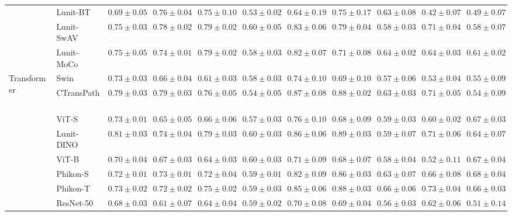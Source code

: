 \begin{tabular}{ll|cccc|c|cccc}
 & Lunit-BT~\cite{kang2023benchmarking} & $0.69 \pm 0.05$ & $0.76 \pm 0.04$ & $0.75 \pm 0.10$ & $0.53 \pm 0.02$ & $0.64 \pm 0.19$ & $0.75 \pm 0.17$ & $0.63 \pm 0.08$ & $0.42 \pm 0.07$ & $0.49 \pm 0.07$ \\
 & Lunit-SwAV~\cite{kang2023benchmarking} & $0.75 \pm 0.03$ & $\mathbf{0.78 \pm 0.02}$ & $\mathbf{0.79 \pm 0.02}$ & $0.60 \pm 0.05$ & $0.83 \pm 0.06$ & $0.79 \pm 0.04$ & $0.58 \pm 0.03$ & $0.71 \pm 0.04$ & $0.58 \pm 0.07$ \\
 & Lunit-MoCo~\cite{kang2023benchmarking} & $0.75 \pm 0.05$ & $0.74 \pm 0.01$ & $0.79 \pm 0.02$ & $0.58 \pm 0.03$ & $0.82 \pm 0.07$ & $0.71 \pm 0.08$ & $0.64 \pm 0.02$ & $0.64 \pm 0.03$ & $0.61 \pm 0.02$ \\
\cline{1-11}
\multirow[t]{12}{*}{Transformer} & Swin~\cite{liu2021swin} & $0.73 \pm 0.03$ & $0.66 \pm 0.04$ & $0.61 \pm 0.03$ & $0.58 \pm 0.03$ & $0.74 \pm 0.10$ & $0.69 \pm 0.10$ & $0.57 \pm 0.06$ & $0.53 \pm 0.04$ & $0.55 \pm 0.09$ \\
 & CTransPath~\cite{wang2022transformer} & $0.79 \pm 0.03$ & $\mathbf{0.79 \pm 0.03}$ & $0.76 \pm 0.05$ & $0.54 \pm 0.05$ & $\mathbf{0.87 \pm 0.08}$ & $0.88 \pm 0.02$ & $0.63 \pm 0.03$ & $0.71 \pm 0.05$ & $0.54 \pm 0.09$ \\
 & ViT-S~\cite{kolesnikov2021image} & $0.73 \pm 0.01$ & $0.65 \pm 0.05$ & $0.66 \pm 0.06$ & $0.57 \pm 0.03$ & $0.76 \pm 0.10$ & $0.68 \pm 0.09$ & $0.59 \pm 0.03$ & $0.60 \pm 0.02$ & $0.67 \pm 0.03$ \\
 & Lunit-DINO~\cite{kang2023benchmarking} & $\mathbf{0.81 \pm 0.03}$ & $0.74 \pm 0.04$ & $\mathbf{0.79 \pm 0.03}$ & $\mathbf{0.60 \pm 0.03}$ & $0.86 \pm 0.06$ & $\mathbf{0.89 \pm 0.03}$ & $0.59 \pm 0.07$ & $0.71 \pm 0.06$ & $0.64 \pm 0.07$ \\
 & ViT-B~\cite{kolesnikov2021image} & $0.70 \pm 0.04$ & $0.67 \pm 0.03$ & $0.64 \pm 0.03$ & $0.60 \pm 0.03$ & $0.71 \pm 0.09$ & $0.68 \pm 0.07$ & $0.58 \pm 0.04$ & $0.52 \pm 0.11$ & $0.67 \pm 0.04$ \\
 & Phikon-S~\cite{filiot2023scaling} & $0.72 \pm 0.01$ & $0.73 \pm 0.01$ & $0.72 \pm 0.04$ & $0.59 \pm 0.01$ & $0.82 \pm 0.09$ & $0.86 \pm 0.03$ & $0.63 \pm 0.07$ & $0.66 \pm 0.08$ & $\mathbf{0.68 \pm 0.04}$ \\
 & Phikon-T~\cite{filiot2023scaling} & $0.73 \pm 0.02$ & $0.72 \pm 0.02$ & $0.75 \pm 0.02$ & $0.59 \pm 0.03$ & $0.85 \pm 0.06$ & $0.88 \pm 0.03$ & $0.66 \pm 0.06$ & $\mathbf{0.73 \pm 0.04}$ & $0.66 \pm 0.03$ \\
 & ResNet-50~\cite{he2015deep} & $0.68 \pm 0.03$ & $0.61 \pm 0.07$ & $0.64 \pm 0.04$ & $0.59 \pm 0.02$ & $0.70 \pm 0.08$ & $0.69 \pm 0.04$ & $0.56 \pm 0.03$ & $0.62 \pm 0.06$ & $0.51 \pm 0.14$ \\

\end{tabular}
